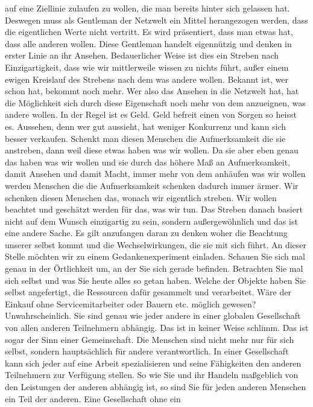 auf eine Ziellinie zulaufen zu wollen, die man bereits hinter sich gelassen hat. Deswegen muss als Gentleman der Netzwelt
ein Mittel herangezogen werden, dass die eigentlichen Werte nicht vertritt. Es wird präsentiert, dass man etwas hat,
dass alle anderen wollen. Diese Gentleman handelt eigennützig und denken in erster Linie an ihr Ansehen.
Bedauerlicher Weise ist dies ein Streben nach Einzigartigkeit, dass wie wir mittlerweile wissen zu nichts führt, außer einem
ewigen Kreislauf des Strebens nach dem was andere wollen. Bekannt ist, wer schon hat, bekommt noch mehr.
Wer also das Ansehen in die Netzwelt hat, hat die Möglichkeit sich durch diese Eigenschaft noch mehr von dem
anzueignen, was andere wollen. In der Regel ist es Geld. Geld befreit einen von Sorgen so heisst es. Aussehen, denn 
wer gut aussieht, hat weniger Konkurrenz und kann sich besser verkaufen. Schenkt man diesen Menschen die Aufmerksamkeit
die sie anstreben, dann weil diese etwas haben was wir wollen. Da sie aber eben genau das haben was wir wollen und 
sie durch das höhere Maß an Aufmerksamkeit, damit Ansehen und damit Macht, immer mehr von dem anhäufen was wir wollen 
werden Menschen die die Aufmerksamkeit schenken dadurch immer ärmer. Wir schenken diesen Menschen das, wonach wir eigentlich
streben. Wir wollen beachtet und geschätzt werden für das, was wir tun. Das Streben danach basiert nicht auf dem
Wunsch einzigartig zu sein, sondern außergewöhnlich und das ist eine andere Sache. Es gilt anzufangen daran zu denken
woher die Beachtung unserer selbst kommt und die Wechselwirkungen, die sie mit sich führt. An dieser Stelle möchten
wir zu einem Gedankenexperiment einladen. Schauen Sie sich mal genau in der Örtlichkeit um, an der Sie sich gerade
befinden. Betrachten Sie mal sich selbst und was Sie heute alles so getan haben. Welche der Objekte haben Sie selbst
angefertigt, die Ressourcen dafür gesammelt und verarbeitet. Wäre der Einkauf ohne Servicemitarbeiter oder Bauern etc. möglich gewesen?
Unwahrscheinlich. Sie sind genau wie jeder andere in einer globalen Gesellschaft von allen anderen Teilnehmern abhängig.
Das ist in keiner Weise schlimm. Das ist sogar der Sinn einer Gemeinschaft. Die Menschen sind nicht mehr nur für sich selbst, sondern
hauptsächlich für andere verantwortlich. In einer Gesellschaft kann sich jeder auf eine Arbeit spezialisieren und
seine Fähigkeiten den anderen Teilnehmern zur Verfügung stellen. So wie Sie und ihr Handeln maßgeblich von den Leistungen
der anderen abhängig ist, so sind Sie für jeden anderen Menschen ein Teil der anderen. Eine Gesellschaft ohne ein
